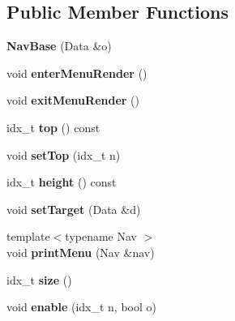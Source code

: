 \subsection*{Public Member Functions}
\begin{DoxyCompactItemize}
\item 
\mbox{\label{classNavBase_a1132b13df31a45d5063f6885ff744a8d}} 
{\bfseries Nav\+Base} (Data \&o)
\item 
\mbox{\label{classNavBase_aff80f3745f21963614f4b39cb5cddbfb}} 
void {\bfseries enter\+Menu\+Render} ()
\item 
\mbox{\label{classNavBase_ad61f33f38293e66e9a6dc5d3f885ff9b}} 
void {\bfseries exit\+Menu\+Render} ()
\item 
\mbox{\label{classNavBase_a62d8e856e7a4a3c7847c423c72f04b90}} 
idx\+\_\+t {\bfseries top} () const
\item 
\mbox{\label{classNavBase_ae97b2cc72048f8476003fc8fc20bf7cc}} 
void {\bfseries set\+Top} (idx\+\_\+t n)
\item 
\mbox{\label{classNavBase_ac73c8b41f88ecdc61c08aab68ecdb0ec}} 
idx\+\_\+t {\bfseries height} () const
\item 
\mbox{\label{classNavBase_a1da54d7ac040ae97c8990087f449208a}} 
void {\bfseries set\+Target} (Data \&d)
\item 
\mbox{\label{classNavBase_aa6815bc1e6e2e4a03758e175e4582d46}} 
{\footnotesize template$<$typename Nav $>$ }\\void {\bfseries print\+Menu} (Nav \&nav)
\item 
\mbox{\label{classNavBase_a8a1b4fb519b387433658f11a46eb1fe9}} 
idx\+\_\+t {\bfseries size} ()
\item 
\mbox{\label{classNavBase_a6be3780547660bc64df57285ced2a60e}} 
void {\bfseries enable} (idx\+\_\+t n, bool o)
\item 
\mbox{\label{classNavBase_a12216027029e4fe1b7d1d3e8b4e8169a}} 

\end{DoxyCompactItemize}
